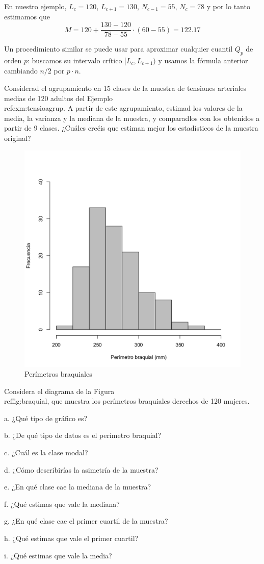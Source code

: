 \documentclass[
]{book}
\theoremstyle{definition}
\theoremstyle{definition}
\theoremstyle{definition}
\theoremstyle{definition}
\theoremstyle{remark}
\begin{document}
En nuestro ejemplo, $L_c=120$, $L_{c+1}=130$, $N_{c-1}=55$, $N_c=78$ y por lo tanto estimamos que
$$
M=120+\frac{130-120}{78-55}\cdot (60- 55)=122.17
$$

Un procedimiento similar se puede usar  para aproximar cualquier cuantil $Q_{p}$ de orden $p$: buscamos su intervalo crítico $[L_c,L_{c+1})$ y usamos la fórmula anterior cambiando $n/2$ por $p\cdot n$.

\begin{rmdexercici}
Considerad el agrupamiento  en 15 clases de la muestra de tensiones arteriales medias de 120 adultos del Ejemplo \\ref{exm:tensioagrup}. A partir de este agrupamiento, estimad los valores de la media, la varianza y la mediana de la muestra, y comparadlos con los obtenidos a partir de 9 clases. ¿Cuáles creéis que estiman mejor los estadísticos de la muestra original?
\end{rmdexercici}

\begin{figure}

{\centering \includegraphics[width=0.6\linewidth]{INREMDN_files/figure-html/braquial} 

}

\caption{Perímetros braquiales}\label{fig:braquial}
\end{figure}


\begin{rmdexercici}
Considera el diagrama de la Figura \\ref{fig:braquial}, que muestra los perímetros braquiales derechos de 120 mujeres.

a. ¿Qué tipo de gráfico es?

b. ¿De qué tipo de datos es el perímetro braquial?

c. ¿Cuál es la clase modal?

d. ¿Cómo describirías la asimetría de la muestra?

e. ¿En qué clase cae la mediana de la muestra?

f. ¿Qué estimas que vale la mediana?

g. ¿En qué clase cae el primer cuartil de la muestra?

h. ¿Qué estimas que vale el primer cuartil?

i. ¿Qué estimas que vale la media?
\end{rmdexercici}
\end{document}
